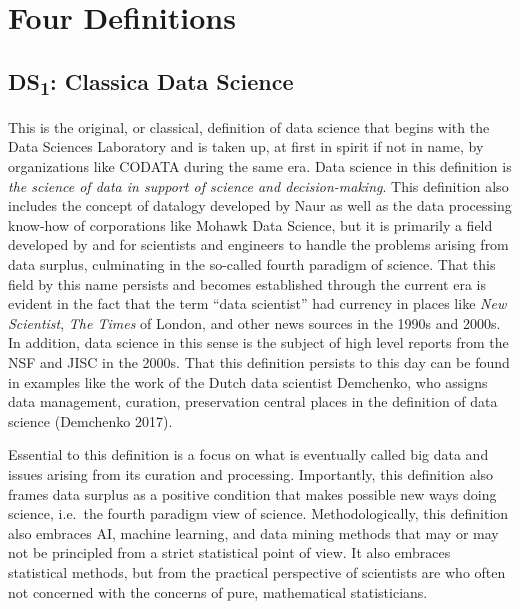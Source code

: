 \documentclass[
  letterpaper,
]{report}
\begin{document}
\hypertarget{four-definitions}{%
\section{Four Definitions}\label{four-definitions}}

\hypertarget{ds1-classica-data-science}{%
\subsection{\texorpdfstring{DS\textsubscript{1}: Classica Data
Science}{DS1: Classica Data Science}}\label{ds1-classica-data-science}}

This is the original, or classical, definition of data science that
begins with the Data Sciences Laboratory and is taken up, at first in
spirit if not in name, by organizations like CODATA during the same era.
Data science in this definition is \emph{the science of data in support
of science and decision-making}. This definition also includes the
concept of datalogy developed by Naur as well as the data processing
know-how of corporations like Mohawk Data Science, but it is primarily a
field developed by and for scientists and engineers to handle the
problems arising from data surplus, culminating in the so-called fourth
paradigm of science. That this field by this name persists and becomes
established through the current era is evident in the fact that the term
``data scientist'' had currency in places like \emph{New Scientist},
\emph{The Times} of London, and other news sources in the 1990s and
2000s. In addition, data science in this sense is the subject of high
level reports from the NSF and JISC in the 2000s. That this definition
persists to this day can be found in examples like the work of the Dutch
data scientist Demchenko, who assigns data management, curation,
preservation central places in the definition of data science (Demchenko
2017).

Essential to this definition is a focus on what is eventually called big
data and issues arising from its curation and processing. Importantly,
this definition also frames data surplus as a positive condition that
makes possible new ways doing science, i.e.~the fourth paradigm view of
science. Methodologically, this definition also embraces AI, machine
learning, and data mining methods that may or may not be principled from
a strict statistical point of view. It also embraces statistical
methods, but from the practical perspective of scientists are who often
not concerned with the concerns of pure, mathematical statisticians.
\end{document}
